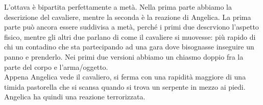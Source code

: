 \documentclass[a4paper]{article}
\begin{document}
\begin{center} %
\begin{minipage}{0.5\textwidth}
\centering
{}
\end{minipage}
\end{center}

L'ottava è bipartita perfettamente a metà.
Nella prima parte abbiamo la descrizione del cavaliere,
mentre la seconda è la reazione di Angelica.
La prima parte può ancora essere suddivisa a metà, perché i primi
due descrviono l'aspetto fisico, mentre gli altri due parlano di 
come il cavaliere si muovesse: più rapido di
chi un contadino che sta partecipando ad una gara
dove bisognasse inseguire un panno e prenderlo.
Nei primi due versioni abbiamo un chiasmo doppio fra la parte del corpo
e l'arma/oggetto.
\\ Appena Angelica vede il cavaliero, si ferma con una rapidità
maggiore di una timida pastorella che si scansa quando si trova un
serpente in mezzo ai piedi.
Angelica ha quindi una reazione terrorizzata.

\begin{center} %
\begin{minipage}{0.5\textwidth}
\centering
{}
\end{minipage}
\end{center}
\end{document}
